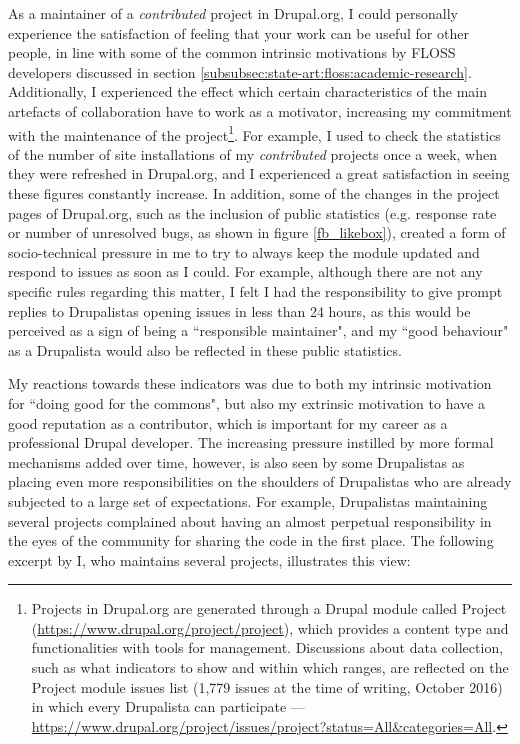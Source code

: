 As a maintainer of a \textit{contributed} project in Drupal.org, I could personally experience the satisfaction of feeling that your work can be useful for other people, in line with some of the common intrinsic motivations by FLOSS developers discussed in section \ref{subsubsec:state-art:floss:academic-research}. Additionally, I experienced the effect which certain characteristics of the main artefacts of collaboration have to work as a motivator, increasing my commitment with the maintenance of the project\footnote{Projects in Drupal.org are generated through a Drupal module called Project (\url{https://www.drupal.org/project/project}), which provides a content type and functionalities with tools for management. Discussions about data collection, such as what indicators to show and within which ranges, are reflected on the Project module issues list (1,779 issues at the time of writing, October 2016) in which every Drupalista can participate --- \url{https://www.drupal.org/project/issues/project?status=All&categories=All}.}. For example, I used to check the statistics of the number of site installations of my \textit{contributed} projects once a week, when they were refreshed in Drupal.org, and I experienced a great satisfaction in seeing these figures constantly increase. In addition, some of the changes in the project pages of Drupal.org, such as the inclusion of public statistics (e.g. response rate or number of unresolved bugs, as shown in figure \ref{fb_likebox}), created a form of socio-technical pressure in me to try to always keep the module updated and respond to issues as soon as I could. For example, although there are not any specific rules regarding this matter, I felt I had the responsibility to give prompt replies to Drupalistas opening issues in less than 24 hours, as this would be perceived as a sign of being a ``responsible maintainer", and my ``good behaviour" as a Drupalista would also be reflected in these public statistics.

My reactions towards these indicators was due to both my intrinsic motivation for ``doing good for the commons", but also my extrinsic motivation to have a good reputation as a contributor, which is important for my career as a professional Drupal developer. The increasing pressure instilled by more formal mechanisms added over time, however, is also seen by some Drupalistas as placing even more responsibilities on the shoulders of Drupalistas who are already subjected to a large set of expectations. For example, Drupalistas maintaining several projects complained about having an almost perpetual responsibility in the eyes of the community for sharing the code in the first place. The following excerpt by I, who maintains several projects, illustrates this view:

